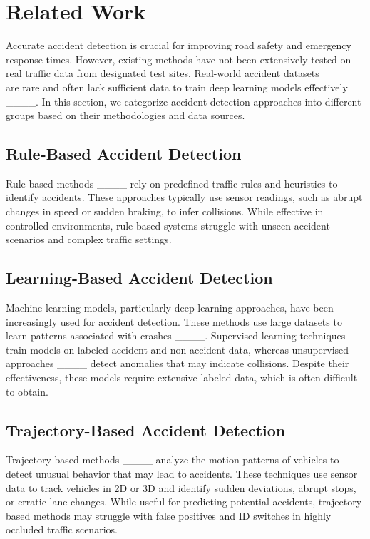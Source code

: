 \section{Related Work}
Accurate accident detection is crucial for improving road safety and emergency response times. However, existing methods have not been extensively tested on real traffic data from designated test sites. Real-world accident datasets ____ are rare and often lack sufficient data to train deep learning models effectively ____. In this section, we categorize accident detection approaches into different groups based on their methodologies and data sources.

\subsection{Rule-Based Accident Detection}
Rule-based methods ____ rely on predefined traffic rules and heuristics to identify accidents. These approaches typically use sensor readings, such as abrupt changes in speed or sudden braking, to infer collisions. While effective in controlled environments, rule-based systems struggle with unseen accident scenarios and complex traffic settings.

\subsection{Learning-Based Accident Detection}
Machine learning models, particularly deep learning approaches, have been increasingly used for accident detection. These methods use large datasets to learn patterns associated with crashes ____. Supervised learning techniques train models on labeled accident and non-accident data, whereas unsupervised approaches ____ detect anomalies that may indicate collisions. Despite their effectiveness, these models require extensive labeled data, which is often difficult to obtain.

\subsection{Trajectory-Based Accident Detection}
Trajectory-based methods ____ analyze the motion patterns of vehicles to detect unusual behavior that may lead to accidents. These techniques use sensor data to track vehicles in 2D or 3D and identify sudden deviations, abrupt stops, or erratic lane changes. While useful for predicting potential accidents, trajectory-based methods may struggle with false positives and ID switches in highly occluded traffic scenarios.

